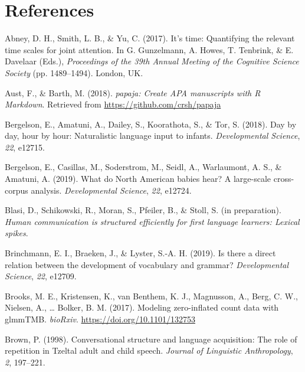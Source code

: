 \documentclass[,man,floatsintext]{apa6}
\begin{document}
\newpage

\section{References}\label{refs}

\begingroup
\setlength{\parindent}{-0.5in} \setlength{\leftskip}{0.5in}

\hypertarget{refs}{}
\hypertarget{ref-abney2017time}{}
Abney, D. H., Smith, L. B., \& Yu, C. (2017). It's time: Quantifying the
relevant time scales for joint attention. In G. Gunzelmann, A. Howes, T.
Tenbrink, \& E. Davelaar (Eds.), \emph{Proceedings of the 39th Annual
Meeting of the Cognitive Science Society} (pp. 1489--1494). London, UK.

\hypertarget{ref-R-papaja}{}
Aust, F., \& Barth, M. (2018). \emph{papaja: Create APA manuscripts with
R Markdown}. Retrieved from \url{https://github.com/crsh/papaja}

\hypertarget{ref-bergelson2018day}{}
Bergelson, E., Amatuni, A., Dailey, S., Koorathota, S., \& Tor, S.
(2018). Day by day, hour by hour: Naturalistic language input to
infants. \emph{Developmental Science}, \emph{22}, e12715.

\hypertarget{ref-bergelsoncasillas2019what}{}
Bergelson, E., Casillas, M., Soderstrom, M., Seidl, A., Warlaumont, A.
S., \& Amatuni, A. (2019). What do North American babies hear? A
large-scale cross-corpus analysis. \emph{Developmental Science},
\emph{22}, e12724.

\hypertarget{ref-blasiIPhuman}{}
Blasi, D., Schikowski, R., Moran, S., Pfeiler, B., \& Stoll, S. (in
preparation). \emph{Human communication is structured efficiently for
first language learners: Lexical spikes}.

\hypertarget{ref-brinchmann2019direct}{}
Brinchmann, E. I., Braeken, J., \& Lyster, S.-A. H. (2019). Is there a
direct relation between the development of vocabulary and grammar?
\emph{Developmental Science}, \emph{22}, e12709.

\hypertarget{ref-brooks2017modeling}{}
Brooks, M. E., Kristensen, K., van Benthem, K. J., Magnusson, A., Berg,
C. W., Nielsen, A., \ldots{} Bolker, B. M. (2017). Modeling
zero-inflated count data with glmmTMB. \emph{bioRxiv}.
\url{https://doi.org/10.1101/132753}

\hypertarget{ref-brown1998conversational}{}
Brown, P. (1998). Conversational structure and language acquisition: The
role of repetition in Tzeltal adult and child speech. \emph{Journal of
Linguistic Anthropology}, \emph{2}, 197--221.
\end{document}
